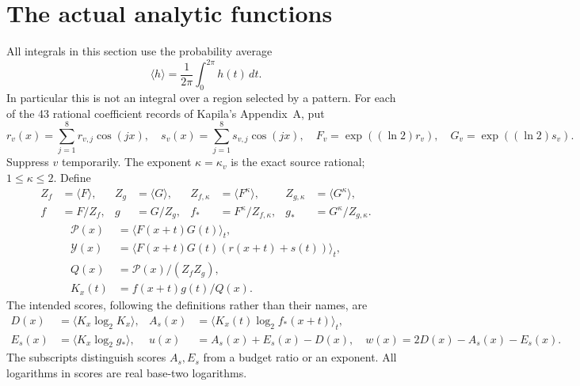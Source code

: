 \section{The actual analytic functions}\label{sec:analytic}
All integrals in this section use the probability average
\[
 \langle h\rangle=\frac1{2\pi}\int_0^{2\pi}h(t)\,dt.
\]
In particular this is not an integral over a region selected by a pattern.
For each of the 43 rational coefficient records of Kapila's Appendix~A,
put
\[
 r_v(x)=\sum_{j=1}^8r_{v,j}\cos(jx),\quad
 s_v(x)=\sum_{j=1}^8s_{v,j}\cos(jx),\quad
 F_v=\exp((\ln2)r_v),\quad G_v=\exp((\ln2)s_v).
\]
Suppress $v$ temporarily. The exponent $\kappa=\kappa_v$ is the exact
source rational; $1\le\kappa\le2$. Define
\begin{align*}
 Z_f&=\langle F\rangle,& Z_g&=\langle G\rangle,&
 Z_{f,\kappa}&=\langle F^\kappa\rangle,&
 Z_{g,\kappa}&=\langle G^\kappa\rangle,\\
 f&=F/Z_f,&g&=G/Z_g,& f_*&=F^\kappa/Z_{f,\kappa},&
 g_*&=G^\kappa/Z_{g,\kappa}.
\end{align*}
\begin{align*}
 \mathcal P(x)&=\langle F(x+t)G(t)\rangle_t,\\
 \mathcal Y(x)&=\langle F(x+t)G(t)(r(x+t)+s(t))\rangle_t,\\
 Q(x)&=\mathcal P(x)/(Z_fZ_g),\\
 K_x(t)&=f(x+t)g(t)/Q(x).
\end{align*}
The intended scores, following the definitions rather than their names,
are
\begin{align*}
 D(x)&=\langle K_x\log_2K_x\rangle,&
 A_s(x)&=\langle K_x(t)\log_2f_*(x+t)\rangle_t,\\
 E_s(x)&=\langle K_x\log_2g_*\rangle,&
 u(x)&=A_s(x)+E_s(x)-D(x),\quad
 w(x)=2D(x)-A_s(x)-E_s(x).
\end{align*}
The subscripts distinguish scores $A_s,E_s$ from a budget ratio or an
exponent. All logarithms in scores are real base-two logarithms.

